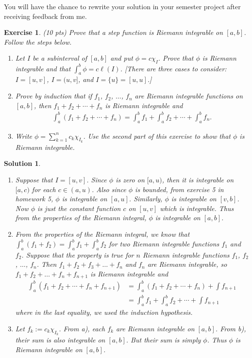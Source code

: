 \documentclass[12pt]{article}
\theoremstyle{plain}
\newtheorem{exer}{\textbf{Exercise}}}
\theoremstyle{plain}
\newtheorem*{sol}{\textbf{Solution}}}
\theoremstyle{plain}
\theoremstyle{plain}
\begin{document}
You will have the chance to rewrite your solution in your semester project after receiving feedback from me.

\begin{exer}
(10 pts)
Prove that a step function is Riemann integrable on $[a, b]$. Follow the steps below.
\begin{enumerate}[label=\textbf{\alph*)}]
\item Let $I$ be a subinterval of $[a, b]$ and put $\phi = c \chi_I$. Prove that $\phi$ is Riemann integrable and that $\int_a^b \phi = c \ell (I)$. [There are three cases to consider: $I = [u, v]$, $I = (u, v]$, and $I = \{ u \} = [u, u]$.]
\item Prove by induction that if $f_1$, $f_2$, $\ldots$, $f_n$ are Riemann integrable functions on $[a, b]$, then $f_1 + f_2 + \cdots + f_n$ is Riemann integrable and
	\begin{align*}
	\int_a^b (f_1 + f_2 + \cdots + f_n) = \int_a^b f_1 + \int_a^b f_2 + \cdots + \int_a^b f_n .
	\end{align*}
\item Write $\phi = \sum_{k = 1}^n c_k \chi_{I_k}$. Use the second part of this exercise to show that $\phi$ is Riemann integrable.
\end{enumerate}
\end{exer}
\begin{sol}
\begin{enumerate}
\item Suppose that $I = [u, v]$. Since $\phi$ is zero on $[a, u)$, then it is integrable on $[a, c)$ for each $c \in (a, u)$. Also since $\phi$ is bounded, from exercise 5 in homework 5, $\phi$ is integrable on $[a, u]$. Similarly, $\phi$ is integrable on $[v, b]$. Now $\phi$ is just the constant function $c$ on $[u, v]$ which is integrable. Thus from the properties of the Riemann integral, $\phi$ is integrable on $[a, b]$.
\item From the properties of the Riemann integral, we know that $\int_a^b (f_1 + f_2) = \int_a^b f_1 + \int_a^b f_2$ for two Riemann integrable functions $f_1$ and $f_2$. Suppose that the property is true for $n$ Riemann integrable functions $f_1$, $f_2$, $\ldots$, $f_n$. Then $f_1 + f_2 + f_3 + \ldots + f_n$ and $f_n$ are Riemann integrable, so $f_1 + f_2 + \ldots + f_n + f_{n+1}$ is Riemann integrable and
	\begin{align*}
	\int_a^b (f_1 + f_2 + \cdots + f_n + f_{n+1}) &= \int_a^b (f_1 + f_2 + \cdots + f_n) + \int f_{n+1} \\
	&= \int_a^b f_1 + \int_a^b f_2 + \cdots + \int f_{n + 1}
	\end{align*}
where in the last equality, we used the induction hypothesis.
\item Let $f_k := c_k \chi_{I_k}$. From a), each $f_k$ are Riemann integrable on $[a, b]$. From b), their sum is also integrable on $[a, b]$. But their sum is simply $\phi$. Thus $\phi$ is Riemann integrable on $[a, b]$.
\end{enumerate}
\end{sol}
\end{document}
